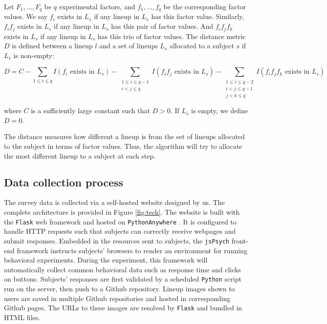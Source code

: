 \documentclass[]{interact}
\theoremstyle{plain}%
\theoremstyle{definition}
\theoremstyle{remark}
\begin{document}
Let \(F_1,...,F_q\) be \(q\) experimental factors, and \(f_1, ...,f_q\)
be the corresponding factor values. We say \(f_i\) exists in \(L_{s}\)
if any lineup in \(L_{s}\) has this factor value. Similarly, \(f_if_j\)
exists in \(L_{s}\) if any lineup in \(L_{s}\) has this pair of factor
values. And \(f_if_jf_k\) exists in \(L_{s}\) if any lineup in \(L_{s}\)
has this trio of factor values. The distance metric \(D\) is defined
between a lineup \(l\) and a set of lineups \(L_{s}\) allocated to a
subject \(s\) if \(L_{s}\) is non-empty:

\footnotesize

\begin{equation*}
D =
C - \sum_{1\leq i \leq q}I(f_i\text{ exists in }L_{s}) - \sum_{\substack{1\leq i \leq q-1 \\ i < j \leq q}}I(f_if_j\text{ exists in }L_{s}) - \sum_{\substack{1\leq i \leq q - 2 \\ i < j \leq q - 1 \\ j < k \leq q}}I(f_if_jf_k\text{ exists in }L_{s})
\end{equation*}

\normalsize

where \(C\) is a sufficiently large constant such that \(D > 0\). If
\(L_{s}\) is empty, we define \(D = 0\).

The distance measures how different a lineup is from the set of lineups
allocated to the subject in terms of factor values. Thus, the algorithm
will try to allocate the most different lineup to a subject at each
step.

\hypertarget{data-collection-process}{%
\subsection{Data collection process}\label{data-collection-process}}

The survey data is collected via a self-hosted website designed by us.
The complete architecture is provided in Figure \ref{fig:tech}. The
website is built with the \texttt{Flask} \citep{flask} web framework and
hosted on \texttt{PythonAnywhere} \citep{pythonanywhere}. It is
configured to handle HTTP requests such that subjects can correctly
receive webpages and submit responses. Embedded in the resources sent to
subjects, the \texttt{jsPsych} front-end framework \citep{jspsych}
instructs subjects' browsers to render an environment for running
behavioral experiments. During the experiment, this framework will
automatically collect common behavioral data such as response time and
clicks on buttons. Subjects' responses are first validated by a
scheduled \texttt{Python} script run on the server, then push to a
Github repository. Lineup images shown to users are saved in multiple
Github repositories and hosted in corresponding Github pages. The URLs
to these images are resolved by \texttt{Flask} and bundled in HTML
files.
\end{document}
